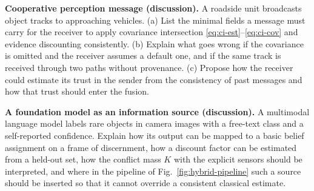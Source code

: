 \begin{prob}\label{prob:ch08:5}
\textbf{Cooperative perception message (discussion).} A roadside unit broadcasts object tracks to approaching vehicles. (a) List the minimal fields a message must carry for the receiver to apply covariance intersection \eqref{eq:ci-est}--\eqref{eq:ci-cov} and evidence discounting consistently. (b) Explain what goes wrong if the covariance is omitted and the receiver assumes a default one, and if the same track is received through two paths without provenance. (c) Propose how the receiver could estimate its trust in the sender from the consistency of past messages and how that trust should enter the fusion.
\end{prob}

\begin{prob}\label{prob:ch08:6}
\textbf{A foundation model as an information source (discussion).} A multimodal language model labels rare objects in camera images with a free-text class and a self-reported confidence. Explain how its output can be mapped to a basic belief assignment on a frame of discernment, how a discount factor can be estimated from a held-out set, how the conflict mass $K$ with the explicit sensors should be interpreted, and where in the pipeline of Fig.~\ref{fig:hybrid-pipeline} such a source should be inserted so that it cannot override a consistent classical estimate.
\end{prob}

